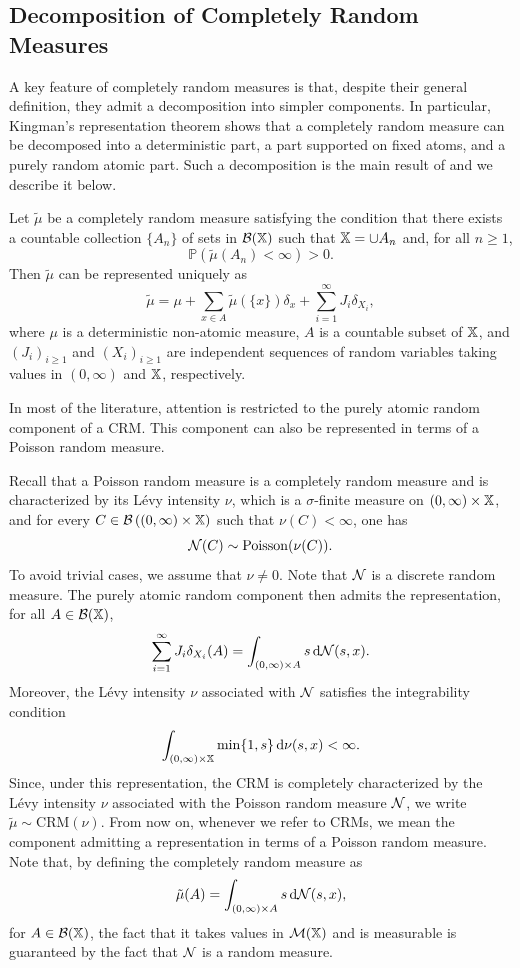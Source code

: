 \subsection{Decomposition of Completely Random Measures}\label{subsection:bnp_toolbox_decomposition_crm}

A key feature of completely random measures is that, despite their general definition, they admit a decomposition into simpler components. In particular, Kingman's representation theorem shows that a completely random measure can be decomposed into a deterministic part, a part supported on fixed atoms, and a purely random atomic part. Such a decomposition is the main result of \cite{kingman1967completely} and we describe it below.

Let $\tilde{\mu}$ be a completely random measure satisfying the condition that there exists a countable collection $\{A_n\}$ of sets in $\mathcal{B}(\mathbb{X})$ such that $\mathbb{X} = \cup A_n$ and, for all $n \geq 1$,
\[
\mathbb{P}\left( \tilde{\mu}(A_n) < \infty\right) > 0.
\]
Then $\tilde{\mu}$ can be represented uniquely as
\[
\tilde{\mu} = \mu + \sum_{x \in A}\tilde{\mu}\left(\{x\}\right)\delta_x + \sum_{i = 1}^\infty J_i \delta_{X_i},
\]
where $\mu$ is a deterministic non-atomic measure, $A$ is a countable subset of $\mathbb{X}$, and $(J_i)_{i \geq 1}$ and $(X_i)_{i \geq 1}$ are independent sequences of random variables taking values in $(0,\infty)$ and $\mathbb{X}$, respectively.

In most of the literature, attention is restricted to the purely atomic random component of a CRM. This component can also be represented in terms of a Poisson random measure.

Recall that a Poisson random measure is a completely random measure and is characterized by its L\'evy intensity $\nu$, which is a $\sigma$-finite measure on $(0,\infty)\times \mathbb{X}$, and for every $C \in \mathcal{B}\left((0,\infty)\times \mathbb{X} \right)$ such that $\nu(C)<\infty$, one has 
\[ 
\mathcal{N}(C) \sim \mathrm{Poisson}(\nu(C)).
\]
To avoid trivial cases, we assume that $\nu \neq 0$. Note that $\mathcal{N}$ is a discrete random measure. The purely atomic random component then admits the representation, for all $A \in \mathcal{B}(\mathbb{X})$,
\[
\sum_{i=1}^\infty J_i \delta_{X_i} ( A )
=
\int_{(0,\infty) \times A} s \, \mathrm{d} \mathcal{N}(s, x).
\]
Moreover, the L\'evy intensity $\nu$ associated with $\mathcal{N}$ satisfies the integrability condition
\[
\int_{(0,\infty) \times \mathbb{X}} \min\{1, s\} \, \mathrm{d}\nu(s, x) < \infty.
\]
Since, under this representation, the CRM is completely characterized by the L\'evy intensity $\nu$ associated with the Poisson random measure $\mathcal{N}$, we write $ \tilde{\mu} \sim \mathrm{CRM}(\nu).$ From now on, whenever we refer to CRMs, we mean the component admitting a representation in terms of a Poisson random measure. Note that, by defining the completely random measure as
\[
\tilde{\mu}(A) = \int_{(0,\infty) \times A} s \, \mathrm{d} \mathcal{N}(s, x),
\]
for $A \in \mathcal{B}(\mathbb{X})$, the fact that it takes values in $\mathcal{M}(\mathbb{X})$ and is measurable is guaranteed by the fact that $\mathcal{N}$ is a random measure.

